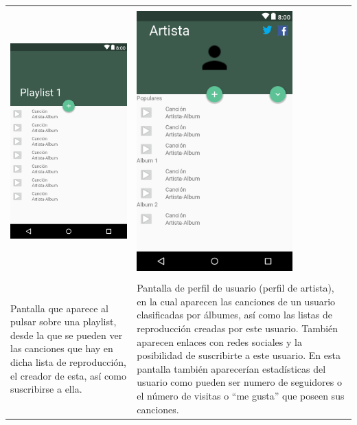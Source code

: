 \begin{tabular}{ p{6cm} p{6cm}}
\hline
\\
\includegraphics[width=6cm]{Figures/android/PlayList.png}
&
\includegraphics[width=6cm]{Figures/android/artista.png} \\
\hline
\\
Pantalla que aparece al pulsar sobre una playlist, desde la que se pueden ver las canciones que hay en dicha lista de reproducción, el creador de esta, así como suscribirse a ella.
&
Pantalla de perfil de usuario (perfil de artista), en la cual aparecen las canciones de un usuario clasificadas por álbumes, así como las listas de reproducción creadas por este usuario. También aparecen enlaces con redes sociales y la posibilidad de suscribirte a este usuario.
En esta pantalla también aparecerían estadísticas del usuario como pueden ser numero de seguidores o el número de visitas o “me gusta” que poseen sus canciones.  
\\
\hline
\end{tabular}

